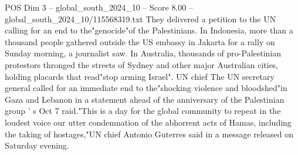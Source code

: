 \begin{textsample}{POS Dim 3 – global\_south\_2024\_10 – Score 8.00 – global\_south\_2024\_10/115568319.txt}
They delivered a petition to the UN calling for an end to the"genocide"of the Palestinians.
In Indonesia, more than a thousand people gathered outside the US embassy in Jakarta for a rally on Sunday morning, a journalist saw.
In Australia, thousands of pro-Palestinian protestors thronged the streets of Sydney and other major Australian cities, holding placards that read"stop arming Israel".
UN chief The UN secretary general called for an immediate end to the"shocking violence and bloodshed"in Gaza and Lebanon in a statement ahead of the anniversary of the Palestinian group ' s Oct 7 raid."This is a day for the global community to repeat in the loudest voice our utter condemnation of the abhorrent acts of Hamas, including the taking of hostages,"UN chief Antonio Guterres said in a message released on Saturday evening.

\end{textsample}
